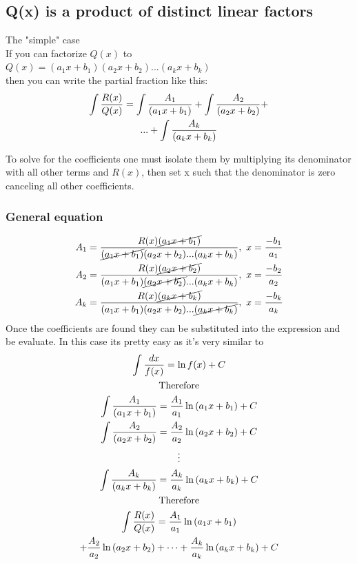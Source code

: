\documentclass[letterpaper,10pt,twoside,twocolumn,openany]{book}
\begin{document}
\subsection{Q(x) is a product of distinct linear factors}
\begin{paperbox}{The "simple" case}\\
    If you can factorize $Q(x)$ to\\
    $ Q(x) = (a_1x + b_1)(a_2x + b_2)...(a_kx + b_k)$\\
    then you can write the partial fraction like this:
    \begin{gather}
        \nonumber
        \large\int \frac{R(x)}{Q(x)} = \int\frac{A_1}{(a_1x + b_1)} + \int\frac{A_2}{(a_2x + b_2)} +\\
        ... + \int\frac{A_k}{(a_kx + b_k)}
    \end{gather} 
\end{paperbox}
To solve for the coefficients one must isolate them by multiplying its denominator with all other terms and $R(x)$, then set x such that the denominator is zero canceling all other coefficients.
\subsubsection{General equation}
\begin{gather*}
    A_1 = \frac{R(x)\cancel{(a_1x + b_1)}}{\cancel{(a_1x + b_1)}(a_2x + b_2)...(a_kx + b_k)},\ x = \frac{-b_1}{a_1}\\
    A_2 = \frac{R(x)\cancel{(a_2x + b_2)}}{(a_1x + b_1)\cancel{(a_2x + b_2)}...(a_kx + b_k)},\ x = \frac{-b_2}{a_2}\\
    A_k = \frac{R(x)\cancel{(a_kx + b_k)}}{(a_1x + b_1)(a_2x + b_2)...\cancel{(a_kx + b_k)}},\ x = \frac{-b_k}{a_k}
\end{gather*}
Once the coefficients are found they can be substituted into the expression and be evaluate. In this case its pretty easy as it's very similar to 
\begin{gather*}
    \large\int \frac{dx}{f(x)} = \ln{f(x)} + C\\
    \text{Therefore}\\
    \int\frac{A_1}{(a_1x + b_1)} = \frac{A_1}{a_1}\ln{(a_1x + b_1)} + C\\
    \int\frac{A_2}{(a_2x + b_2)} = \frac{A_2}{a_2}\ln{(a_2x + b_2)} + C\\
    \vdots\\
    \int\frac{A_k}{(a_kx + b_k)} = \frac{A_k}{a_k}\ln{(a_kx + b_k)} + C\\
    \text{Therefore}\\
    \large\int \frac{R(x)}{Q(x)} = \frac{A_1}{a_1}\ln{(a_1x + b_1)}\\
    + \frac{A_2}{a_2}\ln{(a_2x + b_2)} +  \dots
    + \frac{A_k}{a_k}\ln{(a_kx + b_k)} + C
\end{gather*} 
\newpage
\end{document}
